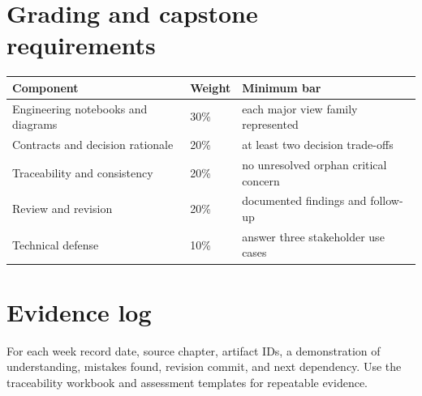 \documentclass[10pt,letterpaper]{article}
\begin{document}
\section{Grading and capstone requirements}
\small
\begin{tabularx}{\linewidth}{@{}YYY@{}}
\toprule
\textbf{Component} & \textbf{Weight} & \textbf{Minimum bar} \\
\midrule
Engineering notebooks and diagrams & 30\% & each major view family represented \\
Contracts and decision rationale & 20\% & at least two decision trade-offs \\
Traceability and consistency & 20\% & no unresolved orphan critical concern \\
Review and revision & 20\% & documented findings and follow-up \\
Technical defense & 10\% & answer three stakeholder use cases \\
\bottomrule
\end{tabularx}
\normalsize
\section{Evidence log}
For each week record date, source chapter, artifact IDs, a demonstration of understanding, mistakes found, revision commit, and next dependency. Use the traceability workbook and assessment templates for repeatable evidence.

\end{document}
